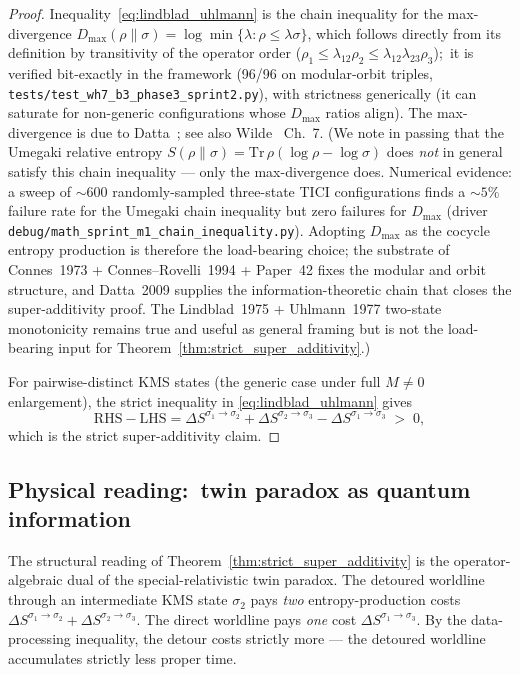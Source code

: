 \documentclass[11pt,a4paper]{article}
\theoremstyle{plain}
\theoremstyle{definition}
\newcommand{\DelS}[2]{\Delta S^{\sigma_{#1}\to\sigma_{#2}}}
\begin{document}
\begin{proof}
Inequality~\eqref{eq:lindblad_uhlmann} is the chain inequality for the
max-divergence $D_{\max}(\rho\|\sigma)=\log\min\{\lambda:\rho\le\lambda\sigma\}$,
which follows directly from its definition by transitivity of the operator
order ($\rho_1\le\lambda_{12}\rho_2\le\lambda_{12}\lambda_{23}\rho_3$);\ it is
verified bit-exactly in the framework (96/96 on modular-orbit triples,
\texttt{tests/test\_wh7\_b3\_phase3\_sprint2.py}), with strictness
generically (it can saturate for non-generic configurations whose
$D_{\max}$ ratios align). The max-divergence is due to
Datta~\cite{datta2009}; see also Wilde~\cite{wilde2017} Ch.~7. (We note in passing that the Umegaki relative entropy
$S(\rho\|\sigma) = \mathrm{Tr}\,\rho(\log\rho - \log\sigma)$ does
\emph{not} in general satisfy this chain inequality --- only the
max-divergence does. Numerical evidence: a sweep of $\sim 600$
randomly-sampled three-state TICI configurations finds a $\sim 5\%$
failure rate for the Umegaki chain inequality but zero failures for
$D_{\max}$ (driver \texttt{debug/math\_sprint\_m1\_chain\_inequality.py}).
Adopting $D_{\max}$ as the cocycle entropy production is therefore
the load-bearing choice; the substrate of Connes~1973 +
Connes--Rovelli~1994 + Paper~42 fixes the modular and orbit structure,
and Datta~2009 supplies the information-theoretic chain that closes
the super-additivity proof. The Lindblad~1975 + Uhlmann~1977
two-state monotonicity remains true and useful as general framing
but is not the load-bearing input for
Theorem~\ref{thm:strict_super_additivity}.)

For pairwise-distinct KMS states (the generic case under full
$M\ne 0$ enlargement), the strict inequality in
\eqref{eq:lindblad_uhlmann} gives
\[
  \mathrm{RHS}-\mathrm{LHS} = \DelS{1}{2}+\DelS{2}{3}-\DelS{1}{3} \;>\; 0,
\]
which is the strict super-additivity claim.
\end{proof}

\subsection{Physical reading:\ twin paradox as quantum information}
\label{sec:twin_paradox_reading}

The structural reading of Theorem~\ref{thm:strict_super_additivity}
is the operator-algebraic dual of the special-relativistic twin
paradox. The detoured worldline through an intermediate KMS state
$\sigma_{2}$ pays \emph{two} entropy-production costs
$\DelS{1}{2}+\DelS{2}{3}$. The direct worldline pays \emph{one} cost
$\DelS{1}{3}$. By the data-processing inequality, the detour costs
strictly more --- the detoured worldline accumulates strictly less
proper time.
\end{document}
